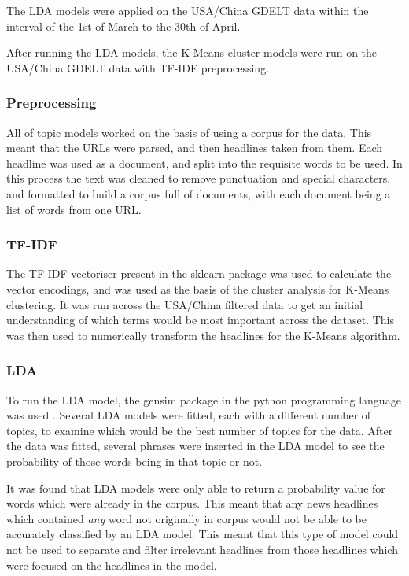 The LDA models were applied on the USA/China GDELT data within the interval of the 1st of March to the 30th of April. 

After running the LDA models, the K-Means cluster models were run on the USA/China GDELT data with TF-IDF preprocessing.

\subsubsection{Preprocessing}
All of topic models worked on the basis of using a corpus for the data, This meant that the URLs were parsed, and then headlines taken from them. Each headline was used as a document, and split into the requisite words to be used. In this process the text was cleaned to remove punctuation and special characters, and formatted to build a corpus full of documents, with each document being a list of words from one URL. 
\subsubsection{TF-IDF}
The TF-IDF vectoriser present in the sklearn package was used to calculate the vector encodings, and was used as the basis of the cluster analysis for K-Means clustering. It was run across the USA/China filtered data to get an initial understanding of which terms would be most important across the dataset. This was then used to numerically transform the headlines for the K-Means algorithm. 

\subsubsection{LDA}
To run the LDA model, the gensim package in the python programming language was used \cite{rehurek_lrec}. Several LDA models were fitted, each with a different number of topics, to examine which would be the best number of topics for the data. After the data was fitted, several phrases were inserted in the LDA model to see the probability of those words being in that topic or not. 

It was found that LDA models were only able to return a probability value for words which were already in the corpus.  This meant that any news headlines which contained \textit{any} word not originally in corpus would not be able to be accurately classified by an LDA model. This meant that this type of model could not be used to separate and filter irrelevant headlines from those headlines which were focused on the headlines in the model. 

